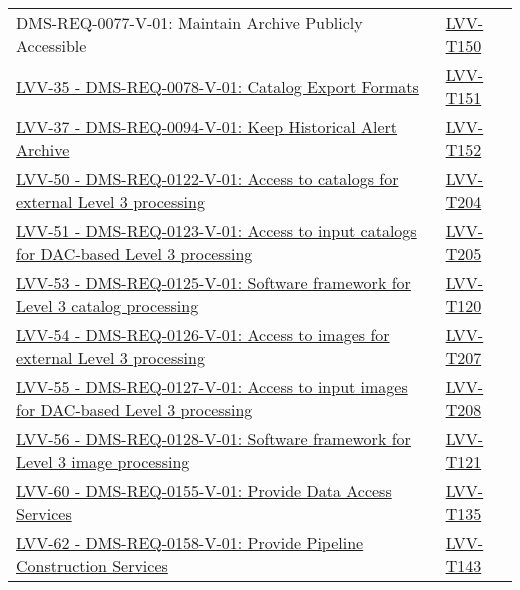 \begin{longtable}[]{p{13cm}p{3cm}}
{DMS-REQ-0077-V-01: Maintain Archive Publicly Accessible} &
\protect\hyperlink{lvv-t150---verify-implementation-of-maintain-archive-publicly-accessible}{LVV-T150}\tabularnewline
\href{https://jira.lsstcorp.org/browse/LVV-35}{LVV-35 -
DMS-REQ-0078-V-01: Catalog Export Formats} &
\protect\hyperlink{lvv-t151---verify-implementation-of-catalog-export-formats}{LVV-T151}\tabularnewline
\href{https://jira.lsstcorp.org/browse/LVV-37}{LVV-37 -
DMS-REQ-0094-V-01: Keep Historical Alert Archive} &
\protect\hyperlink{lvv-t152---verify-implementation-of-keep-historical-alert-archive}{LVV-T152}\tabularnewline
\href{https://jira.lsstcorp.org/browse/LVV-50}{LVV-50 -
DMS-REQ-0122-V-01: Access to catalogs for external Level 3 processing} &
\protect\hyperlink{lvv-t204---verify-implementation-of-access-to-catalogs-for-external-level-3-processing}{LVV-T204}\tabularnewline
\href{https://jira.lsstcorp.org/browse/LVV-51}{LVV-51 -
DMS-REQ-0123-V-01: Access to input catalogs for DAC-based Level 3
processing} &
\protect\hyperlink{lvv-t205---verify-implementation-of-access-to-input-catalogs-for-dac-based-level-3-processing}{LVV-T205}\tabularnewline
\href{https://jira.lsstcorp.org/browse/LVV-53}{LVV-53 -
DMS-REQ-0125-V-01: Software framework for Level 3 catalog processing} &
\protect\hyperlink{lvv-t120---verify-implementation-of-software-framework-for-level-3-catalog-processing}{LVV-T120}\tabularnewline
\href{https://jira.lsstcorp.org/browse/LVV-54}{LVV-54 -
DMS-REQ-0126-V-01: Access to images for external Level 3 processing} &
\protect\hyperlink{lvv-t207---verify-implementation-of-access-to-images-for-external-level-3-processing}{LVV-T207}\tabularnewline
\href{https://jira.lsstcorp.org/browse/LVV-55}{LVV-55 -
DMS-REQ-0127-V-01: Access to input images for DAC-based Level 3
processing} &
\protect\hyperlink{lvv-t208---verify-implementation-of-access-to-input-images-for-dac-based-level-3-processing}{LVV-T208}\tabularnewline
\href{https://jira.lsstcorp.org/browse/LVV-56}{LVV-56 -
DMS-REQ-0128-V-01: Software framework for Level 3 image processing} &
\protect\hyperlink{lvv-t121---verify-implementation-of-software-framework-for-level-3-image-processing}{LVV-T121}\tabularnewline
\href{https://jira.lsstcorp.org/browse/LVV-60}{LVV-60 -
DMS-REQ-0155-V-01: Provide Data Access Services} &
\protect\hyperlink{lvv-t135---verify-implementation-of-provide-data-access-services}{LVV-T135}\tabularnewline
\href{https://jira.lsstcorp.org/browse/LVV-62}{LVV-62 -
DMS-REQ-0158-V-01: Provide Pipeline Construction Services} &
\protect\hyperlink{lvv-t143---verify-implementation-of-provide-pipeline-construction-services}{LVV-T143}\tabularnewline

\end{longtable}
